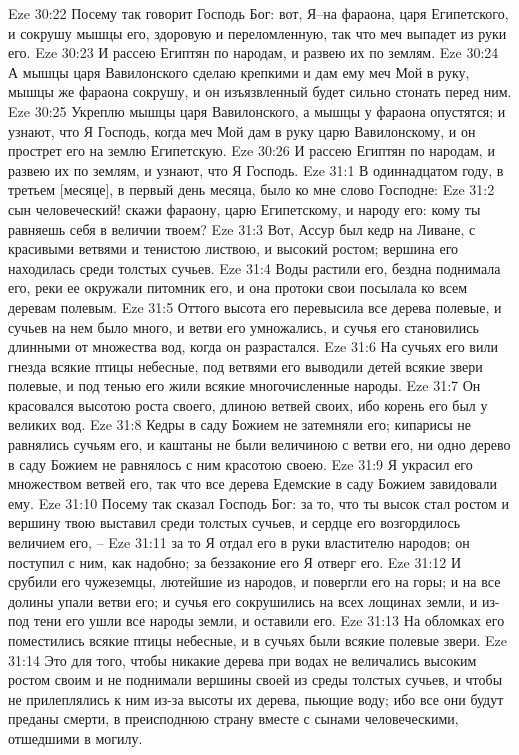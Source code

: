 Eze 30:22  Посему так говорит Господь Бог: вот, Я--на фараона, царя Египетского, и сокрушу мышцы его, здоровую и переломленную, так что меч выпадет из руки его.
Eze 30:23  И рассею Египтян по народам, и развею их по землям.
Eze 30:24  А мышцы царя Вавилонского сделаю крепкими и дам ему меч Мой в руку, мышцы же фараона сокрушу, и он изъязвленный будет сильно стонать перед ним.
Eze 30:25  Укреплю мышцы царя Вавилонского, а мышцы у фараона опустятся; и узнают, что Я Господь, когда меч Мой дам в руку царю Вавилонскому, и он прострет его на землю Египетскую.
Eze 30:26  И рассею Египтян по народам, и развею их по землям, и узнают, что Я Господь.
Eze 31:1  В одиннадцатом году, в третьем [месяце], в первый день месяца, было ко мне слово Господне:
Eze 31:2  сын человеческий! скажи фараону, царю Египетскому, и народу его: кому ты равняешь себя в величии твоем?
Eze 31:3  Вот, Ассур был кедр на Ливане, с красивыми ветвями и тенистою листвою, и высокий ростом; вершина его находилась среди толстых сучьев.
Eze 31:4  Воды растили его, бездна поднимала его, реки ее окружали питомник его, и она протоки свои посылала ко всем деревам полевым.
Eze 31:5  Оттого высота его перевысила все дерева полевые, и сучьев на нем было много, и ветви его умножались, и сучья его становились длинными от множества вод, когда он разрастался.
Eze 31:6  На сучьях его вили гнезда всякие птицы небесные, под ветвями его выводили детей всякие звери полевые, и под тенью его жили всякие многочисленные народы.
Eze 31:7  Он красовался высотою роста своего, длиною ветвей своих, ибо корень его был у великих вод.
Eze 31:8  Кедры в саду Божием не затемняли его; кипарисы не равнялись сучьям его, и каштаны не были величиною с ветви его, ни одно дерево в саду Божием не равнялось с ним красотою своею.
Eze 31:9  Я украсил его множеством ветвей его, так что все дерева Едемские в саду Божием завидовали ему.
Eze 31:10  Посему так сказал Господь Бог: за то, что ты высок стал ростом и вершину твою выставил среди толстых сучьев, и сердце его возгордилось величием его, --
Eze 31:11  за то Я отдал его в руки властителю народов; он поступил с ним, как надобно; за беззаконие его Я отверг его.
Eze 31:12  И срубили его чужеземцы, лютейшие из народов, и повергли его на горы; и на все долины упали ветви его; и сучья его сокрушились на всех лощинах земли, и из-под тени его ушли все народы земли, и оставили его.
Eze 31:13  На обломках его поместились всякие птицы небесные, и в сучьях были всякие полевые звери.
Eze 31:14  Это для того, чтобы никакие дерева при водах не величались высоким ростом своим и не поднимали вершины своей из среды толстых сучьев, и чтобы не прилеплялись к ним из-за высоты их дерева, пьющие воду; ибо все они будут преданы смерти, в преисподнюю страну вместе с сынами человеческими, отшедшими в могилу.
